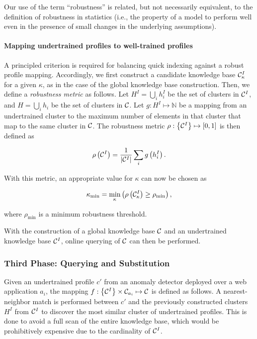 \begin{note}[Robustness]
  Our use of the term ``robustness'' is related, but not necessarily equivalent, to the definition of robustness in statistics (i.e., the property of a model to perform well even in the presence of small changes in the underlying assumptions).
\end{note}

\paragraph{Mapping undertrained profiles to well-trained profiles}
\label{web:longtail:design:mapping}
A principled criterion is required for balancing quick indexing against a robust profile mapping.  Accordingly, we first construct a candidate knowledge base $\mathcal{C}_{\kappa}^I$ for a given $\kappa$, as in the case of the global knowledge base construction.  Then, we define a \emph{robustness metric} as follows.  Let $H^I=\bigcup_{i}h_i^I$ be the set of clusters in $\mathcal{C}^I$, and $H=\bigcup_{i}h_i$ be the set of clusters in $\mathcal{C}$.  Let $g:H^I\mapsto\mathbb{N}$ be a mapping from an undertrained cluster to the maximum number of elements in that cluster that map to the same cluster in $\mathcal{C}$.  The robustness metric $\rho:\left\{\mathcal{C}^I\right\}\mapsto\left[0,1\right]$ is then defined as

\begin{equation}
  \rho\left(\mathcal{C}^I\right)=\frac{1}{\left|\mathcal{C}^I\right|}\sum_{i}g\left(h_i^I\right).
\end{equation}

With this metric, an appropriate value for $\kappa$ can now be chosen as

\begin{equation}
  \kappa_{\text{min}}=\min_{\kappa}\left(\rho\left(\mathcal{C}_{\kappa}^I\right)\geq \rho_{\text{min}}\right),
\end{equation}

where $\rho_{\text{min}}$ is a minimum robustness threshold.

With the construction of a global knowledge base $\mathcal{C}$ and an undertrained knowledge base $\mathcal{C}^I$, online querying of $\mathcal{C}$ can then be performed.

\subsubsection{Third Phase: Querying and Substitution}
Given an undertrained profile $c'$ from an anomaly detector deployed over a web application $a_i$, the mapping $f:\left\{\mathcal{C}^I\right\}\times\mathcal{C}_{a_i}\mapsto\mathcal{C}$ is defined as follows.  A nearest\hyp{}neighbor match is performed between $c'$ and the previously constructed clusters $H^I$ from $\mathcal{C}^I$ to discover the most similar cluster of undertrained profiles.  This is done to avoid a full scan of the entire knowledge base, which would be prohibitively expensive due to the cardinality of $\mathcal{C}^I$.

